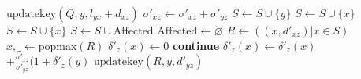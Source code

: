 \begin{algorithm}[H]
\begin{multicols}{2}
\begin{algorithmic}[1]
      \State $\mathrm{updatekey}(Q,y,l_{yx}+d_{xz})$
      \EndIf
      \State $\sigma'_{xz}\gets\sigma'_{xz}+\sigma'_{yz}$
      \EndIf
      \State $S\gets S\cup\{y\}$
      \EndIf
      \State $S\gets S\cup\{x\}$
      \EndIf
      \EndFor
      \State $S\gets S\cup\{x\}$
      \EndIf
      \EndWhile
      \State
      \State $S\gets S\cup\mathrm{Affected}$
      \State $\mathrm{Affected}\gets\varnothing$
      \State $R\gets((x,d'_{xz})\vert x\in S)$
      \State $x,\_\gets\mathrm{popmax}(R)$
      \State $\delta'_z(x)\gets 0$
      \State \textbf{continue}
      \EndIf
      \State $\delta'_z(x)\gets\delta'_z(x)$
      $+\frac{\sigma'_{xz}}{\sigma'_{yz}}(1+\delta'_z(y)$
      \State $\mathrm{updatekey}(R, y, d'_{yz})$
      \EndIf
      \EndFor
      \EndWhile
      \EndProcedure
    \end{algorithmic}
  \end{multicols}
\end{algorithm}
